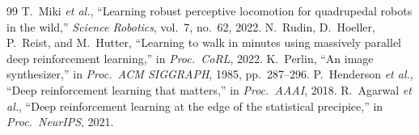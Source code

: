 \documentclass[conference]{IEEEtran}
\begin{document}
\begin{thebibliography}{99}
 T.~Miki \emph{et al.}, ``Learning robust perceptive locomotion for quadrupedal robots in the wild,'' \emph{Science Robotics}, vol.~7, no.~62, 2022.
 N.~Rudin, D.~Hoeller, P.~Reist, and M.~Hutter, ``Learning to walk in minutes using massively parallel deep reinforcement learning,'' in \emph{Proc.\ CoRL}, 2022.
 K.~Perlin, ``An image synthesizer,'' in \emph{Proc.\ ACM SIGGRAPH}, 1985, pp.~287--296.
 P.~Henderson \emph{et al.}, ``Deep reinforcement learning that matters,'' in \emph{Proc.\ AAAI}, 2018.
 R.~Agarwal \emph{et al.}, ``Deep reinforcement learning at the edge of the statistical precipice,'' in \emph{Proc.\ NeurIPS}, 2021.
\end{thebibliography}
\end{document}
